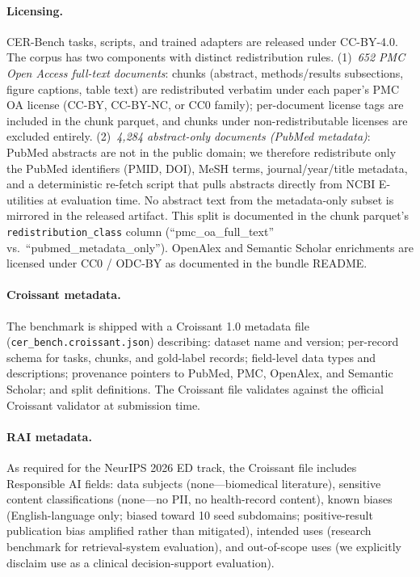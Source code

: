 \documentclass{article}
\begin{document}
\paragraph{Licensing.} CER-Bench tasks, scripts, and trained adapters are released under CC-BY-4.0. The corpus has two components with distinct redistribution rules. (1)~\emph{652 PMC Open Access full-text documents}: chunks (abstract, methods/results subsections, figure captions, table text) are redistributed verbatim under each paper's PMC OA license (CC-BY, CC-BY-NC, or CC0 family); per-document license tags are included in the chunk parquet, and chunks under non-redistributable licenses are excluded entirely. (2)~\emph{4{,}284 abstract-only documents (PubMed metadata)}: PubMed abstracts are not in the public domain; we therefore redistribute only the PubMed identifiers (PMID, DOI), MeSH terms, journal/year/title metadata, and a deterministic re-fetch script that pulls abstracts directly from NCBI E-utilities at evaluation time. No abstract text from the metadata-only subset is mirrored in the released artifact. This split is documented in the chunk parquet's \texttt{redistribution\_class} column (``pmc\_oa\_full\_text'' vs.\ ``pubmed\_metadata\_only''). OpenAlex and Semantic Scholar enrichments are licensed under CC0 / ODC-BY as documented in the bundle README.

\paragraph{Croissant metadata.} The benchmark is shipped with a Croissant 1.0 metadata file (\texttt{cer\_bench.croissant.json}) describing: dataset name and version; per-record schema for tasks, chunks, and gold-label records; field-level data types and descriptions; provenance pointers to PubMed, PMC, OpenAlex, and Semantic Scholar; and split definitions. The Croissant file validates against the official Croissant validator at submission time.

\paragraph{RAI metadata.} As required for the NeurIPS 2026 ED track, the Croissant file includes Responsible AI fields: data subjects (none---biomedical literature), sensitive content classifications (none---no PII, no health-record content), known biases (English-language only; biased toward 10 seed subdomains; positive-result publication bias amplified rather than mitigated), intended uses (research benchmark for retrieval-system evaluation), and out-of-scope uses (we explicitly disclaim use as a clinical decision-support evaluation).
\end{document}
